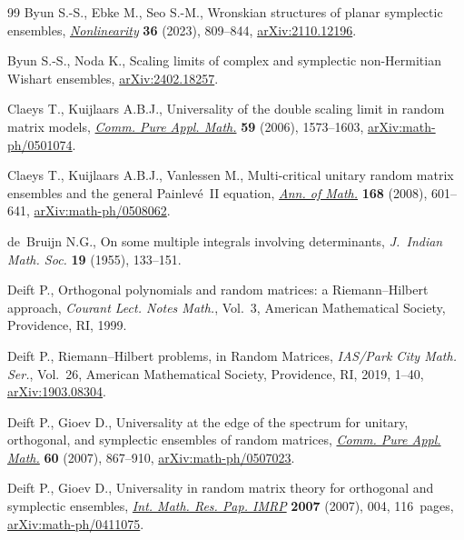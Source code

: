 \documentclass[pdftex]{sigma}
\numberwithin{equation}{section}
\begin{document}
\begin{thebibliography}{99}
Byun S.-S., Ebke M., Seo S.-M., Wronskian structures of planar symplectic
 ensembles, \href{https://doi.org/10.1088/1361-6544/aca3f4}{\textit{Nonlinearity}} \textbf{36} (2023), 809--844,
 \href{https://arxiv.org/abs/2110.12196}{arXiv:2110.12196}.

Byun S.-S., Noda K., Scaling limits of complex and symplectic non-{H}ermitian
 {W}ishart ensembles, \href{https://arxiv.org/abs/2402.18257}{arXiv:2402.18257}.

Claeys T., Kuijlaars A.B.J., Universality of the double scaling limit in random
 matrix models, \href{https://doi.org/10.1002/cpa.20113}{\textit{Comm. Pure Appl. Math.}} \textbf{59} (2006),
 1573--1603, \href{https://arxiv.org/abs/math-ph/0501074}{arXiv:math-ph/0501074}.

Claeys T., Kuijlaars A.B.J., Vanlessen M., Multi-critical unitary random matrix
 ensembles and the general {P}ainlev\'e~{II} equation, \href{https://doi.org/10.4007/annals.2008.168.601}{\textit{Ann. of Math.}}
 \textbf{168} (2008), 601--641, \href{https://arxiv.org/abs/math-ph/0508062}{arXiv:math-ph/0508062}.

de~Bruijn N.G., On some multiple integrals involving determinants, \textit{J.~Indian Math. Soc.} \textbf{19} (1955), 133--151.

Deift P., Orthogonal polynomials and random matrices: a {R}iemann--{H}ilbert
 approach, \textit{Courant Lect. Notes Math.}, Vol.~3, American Mathematical
 Society, Providence, RI, 1999.

Deift P., Riemann--{H}ilbert problems, in Random {M}atrices, \textit{IAS/Park
 City Math. Ser.}, Vol.~26, American Mathematical Society, Providence, RI,
 2019, 1--40, \href{https://arxiv.org/abs/1903.08304}{arXiv:1903.08304}.

Deift P., Gioev D., Universality at the edge of the spectrum for unitary,
 orthogonal, and symplectic ensembles of random matrices, \href{https://doi.org/10.1002/cpa.20164}{\textit{Comm. Pure
 Appl. Math.}} \textbf{60} (2007), 867--910, \href{https://arxiv.org/abs/math-ph/0507023}{arXiv:math-ph/0507023}.

Deift P., Gioev D., Universality in random matrix theory for orthogonal and
 symplectic ensembles, \href{https://doi.org/10.1093/imrp/rpm004}{\textit{Int. Math. Res. Pap. IMRP}} \textbf{2007}
 (2007), 004, 116~pages, \href{https://arxiv.org/abs/math-ph/0411075}{arXiv:math-ph/0411075}.


\end{thebibliography}
\end{document}
